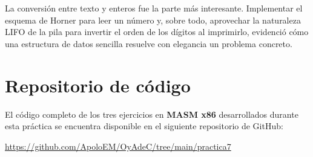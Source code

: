\documentclass[a4paper,12pt]{article}
\begin{document}
La conversión entre texto y enteros fue la parte más interesante. Implementar el esquema de Horner para leer un número y, sobre todo, aprovechar la naturaleza LIFO de la pila para invertir el orden de los dígitos al imprimirlo, evidenció cómo una estructura de datos sencilla resuelve con elegancia un problema concreto.

\newpage
\nocite{*}
\printbibliography[title={Referencias}]

\appendix
\section{Repositorio de código}
El código completo de los tres ejercicios en \textbf{MASM x86} desarrollados durante esta práctica se encuentra disponible en el siguiente repositorio de GitHub:

\begin{center}
\url{https://github.com/ApoloEM/OyAdeC/tree/main/practica7}
\end{center}
\end{document}

